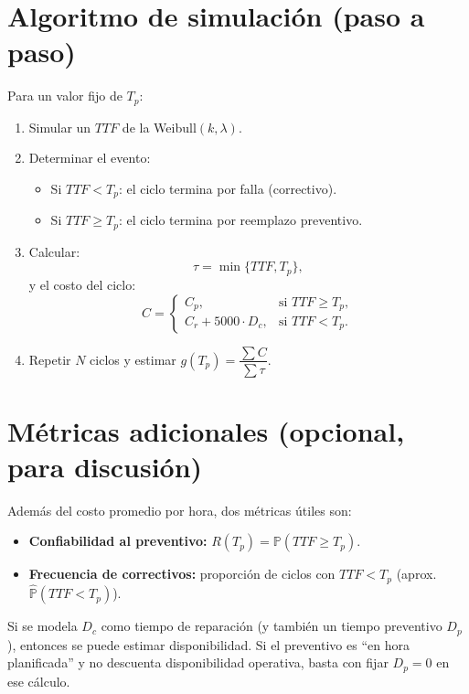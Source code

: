 \documentclass[11pt,a4paper]{article}
\begin{document}
\section{Algoritmo de simulación (paso a paso)}
Para un valor fijo de $T_p$:
\begin{enumerate}
    \item Simular un $TTF$ de la Weibull$(k,\lambda)$.
    \item Determinar el evento:
    \begin{itemize}
        \item Si $TTF<T_p$: el ciclo termina por falla (correctivo).
        \item Si $TTF\ge T_p$: el ciclo termina por reemplazo preventivo.
    \end{itemize}
    \item Calcular:
    \[
    \tau = \min\{TTF,T_p\},
    \]
    y el costo del ciclo:
    \[
    C =
    \begin{cases}
      C_p, & \text{si } TTF\ge T_p,\\[4pt]
      C_r + 5000\cdot D_c, & \text{si } TTF<T_p.
    \end{cases}
    \]
    \item Repetir $N$ ciclos y estimar $g(T_p)=\dfrac{\sum C}{\sum \tau}$.
\end{enumerate}

\section{Métricas adicionales (opcional, para discusión)}
Además del costo promedio por hora, dos métricas útiles son:
\begin{itemize}
    \item \textbf{Confiabilidad al preventivo:} $R(T_p)=\mathbb{P}(TTF\ge T_p)$.
    \item \textbf{Frecuencia de correctivos:} proporción de ciclos con $TTF<T_p$ (aprox. $\widehat{\mathbb{P}}(TTF<T_p)$).
\end{itemize}
Si se modela $D_c$ como tiempo de reparación (y también un tiempo preventivo $D_p$), entonces se puede estimar disponibilidad.
Si el preventivo es ``en hora planificada'' y no descuenta disponibilidad operativa, basta con fijar $D_p=0$ en ese cálculo.
\end{document}
